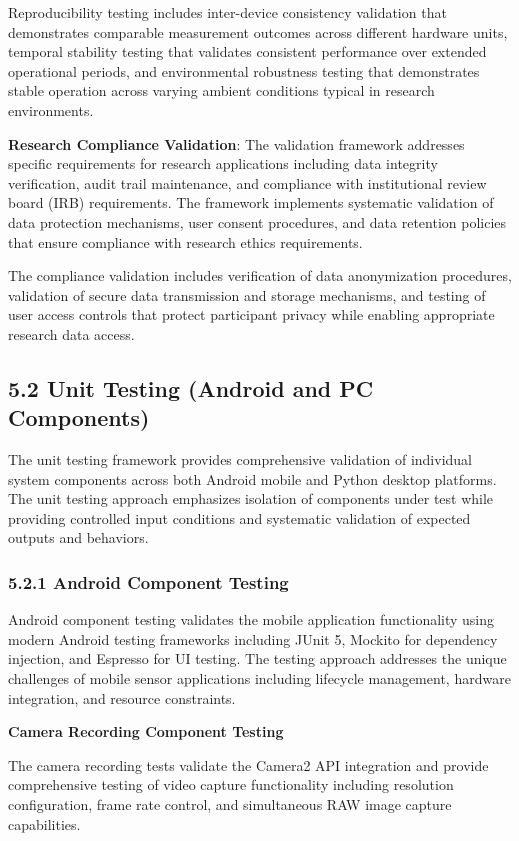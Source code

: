 \documentclass[12pt,a4paper]{article}
\begin{document}
Reproducibility testing includes inter-device consistency validation that demonstrates comparable measurement outcomes
across different hardware units, temporal stability testing that validates consistent performance over extended
operational periods, and environmental robustness testing that demonstrates stable operation across varying ambient
conditions typical in research environments.

\textbf{Research Compliance Validation}: The validation framework addresses specific requirements for research applications
including data integrity verification, audit trail maintenance, and compliance with institutional review board (IRB)
requirements. The framework implements systematic validation of data protection mechanisms, user consent procedures, and
data retention policies that ensure compliance with research ethics requirements.

The compliance validation includes verification of data anonymization procedures, validation of secure data transmission
and storage mechanisms, and testing of user access controls that protect participant privacy while enabling appropriate
research data access.

\subsection{5.2 Unit Testing (Android and PC Components)}

The unit testing framework provides comprehensive validation of individual system components across both Android mobile
and Python desktop platforms. The unit testing approach emphasizes isolation of components under test while providing
controlled input conditions and systematic validation of expected outputs and behaviors.

\subsubsection{5.2.1 Android Component Testing}

Android component testing validates the mobile application functionality using modern Android testing frameworks
including JUnit 5, Mockito for dependency injection, and Espresso for UI testing. The testing approach addresses the
unique challenges of mobile sensor applications including lifecycle management, hardware integration, and resource
constraints.

\textbf{Camera Recording Component Testing}

The camera recording tests validate the Camera2 API integration and provide comprehensive testing of video capture
functionality including resolution configuration, frame rate control, and simultaneous RAW image capture capabilities.
\end{document}
